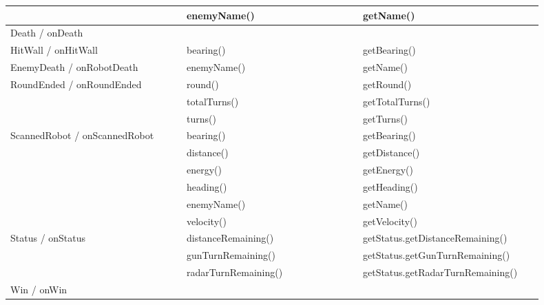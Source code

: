 \begin{center}
\begin{tabular}{ | p{0.3\linewidth} | p{0.3\linewidth} | p{0.3\linewidth} |}
		& enemyName() & getName() \\ \hline
		Death / onDeath & & \\ \hline
		HitWall / onHitWall & bearing() & getBearing() \\ \hline
		EnemyDeath / onRobotDeath & enemyName() & getName() \\ \hline
		RoundEnded / onRoundEnded & round() & getRound() \\ \hline
		& totalTurns() & getTotalTurns() \\ \hline
		& turns() & getTurns() \\ \hline
		ScannedRobot / onScannedRobot & bearing() & getBearing() \\ \hline
		& distance() & getDistance() \\ \hline
		& energy() & getEnergy() \\ \hline
		& heading() & getHeading() \\ \hline
		& enemyName() & getName() \\ \hline
		& velocity() & getVelocity() \\ \hline
		Status / onStatus & distanceRemaining() & getStatus.getDistanceRemaining() \\ \hline
		& gunTurnRemaining() & getStatus.getGunTurnRemaining() \\ \hline
		& radarTurnRemaining() & getStatus.getRadarTurnRemaining() \\ \hline
		Win / onWin &  & \\
		\hline
	\end{tabular}
\end{center}